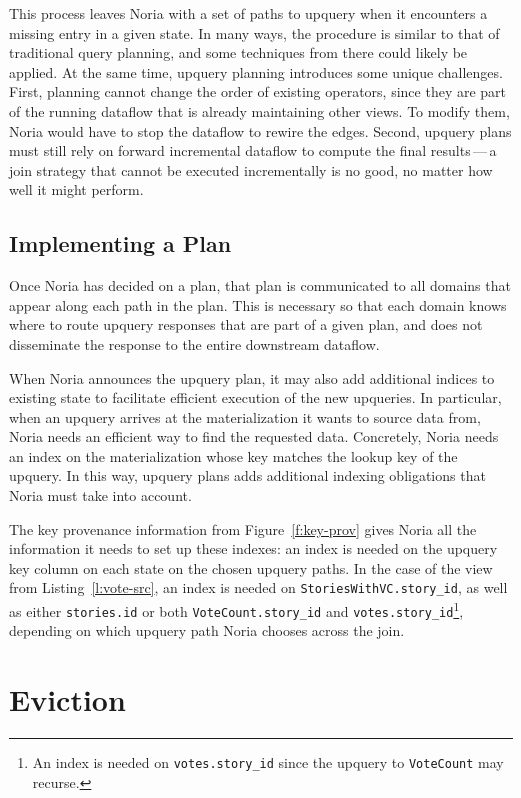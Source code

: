 This process leaves Noria with a set of paths to upquery when it encounters a
missing entry in a given state. In many ways, the procedure is similar to that
of traditional query planning, and some techniques from there could likely be
applied. At the same time, upquery planning introduces some unique challenges.
First, planning cannot change the order of existing operators, since they are
part of the running dataflow that is already maintaining other views. To modify
them, Noria would have to stop the dataflow to rewire the edges. Second, upquery
plans must still rely on forward incremental dataflow to compute the final
results\,---\,a join strategy that cannot be executed incrementally is no good,
no matter how well it might perform.

\subsection{Implementing a Plan}

Once Noria has decided on a plan, that plan is communicated to all domains
that appear along each path in the plan. This is necessary so that each domain
knows where to route upquery responses that are part of a given plan, and does
not disseminate the response to the entire downstream dataflow.

When Noria announces the upquery plan, it may also add additional indices
to existing state to facilitate efficient execution of the new upqueries. In
particular, when an upquery arrives at the materialization it wants to source
data from, Noria needs an efficient way to find the requested data. Concretely,
Noria needs an index on the materialization whose key matches the lookup key of
the upquery. In this way, upquery plans adds additional indexing obligations
that Noria must take into account.

The key provenance information from Figure~\ref{f:key-prov} gives Noria all the
information it needs to set up these indexes: an index is needed on the upquery
key column on each state on the chosen upquery paths. In the case of the view
from Listing~\ref{l:vote-src}, an index is needed on
\texttt{StoriesWithVC.story\_id}, as well as either \texttt{stories.id} or both
\texttt{VoteCount.story\_id} and \texttt{votes.story\_id}\footnote{An index is
needed on \texttt{votes.story\_id} since the upquery to \texttt{VoteCount} may
recurse.}, depending on which upquery path Noria chooses across the join.

\section{Eviction}

